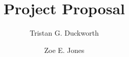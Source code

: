 \documentclass[format=acmsmall, review=false, screen=true]{acmart}
\begin{document}
    \title[Project Proposal]{Project Proposal}  
    \author{Tristan G. Duckworth}
    \author{Zoe E. Jones}
    
    \maketitle
    
    \renewcommand{\shortauthors}{G. Zhou et al.}
    
    
    
\end{document}
